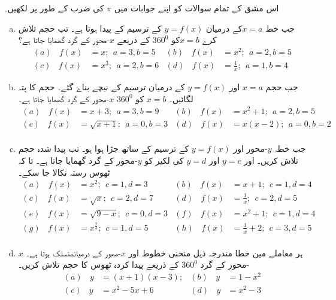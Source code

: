 اس مشق کے تمام سوالات کو اپنے جوابات میں \(\pi\) کی ضرب کے طور پر لکھیں۔
\begin{enumerate}[a.]
\item
جب خط  \(x=a\)کے درمیان \(y=f(x)\) کے ترسیم کے پیدا ہوتا ہے۔ تب حجم تلاش کرے \(x=b\)کو \(360^0\) کے ذریعے  \(x\)-محور کے گرد گھمایا جاتا ہے؟
\begin{align*}
(a) \> \> \> \> f(x)&=x; \> \> a=3, b=5  & (b)  \> \> \> \> f(x)&=x^{2};  \> \>a=2, b=5 \\
(c) \> \> \> \> f(x)&=x^{3};  \> \> a=2, b=6 & (d)  \> \> \> \> f(x)&= \frac {1}{x} ; \> \> a=1, b=4
\end{align*}
\item
جب حجم  \(x=a\) اور \(y=f(x)\) کے درمیان ترسیم کے نیچے بناۓ گئے۔ حجم کا پتہ لگائیں۔ \(x=b\) کو \(360^0\) \(x\)-محور کے گرد گھمایا جاتا ہے۔
\begin{align*}
(a) \> \> \> \>f(x)&=x+3;  \> \> a=3, b=9 &  (b) \> \> \> \> f(x)&=x^{2}+1;  \> \>a=2, b=5 \\
(c) \> \> \> \> f(x)&=\sqrt {x+1} ;  \> \> a=0, b=3 & (d) \> \> \> \> f(x)&= x(x-2) ; \> \> a=0, b=2\\
\end{align*}
\item
جب خطہ \(y\)-محور اور \(y=f(x)\)  کے ترسیم کے ساتھ جڑا ہوا ہو۔  تب پیدا شدہ حجم تلاش کریں۔ اور \(y=c\)  اور \(y=d\)  کی لکیر کو \(y\)-محور کے گرد گھمایا جاتا ہے۔ تا کہ ٹھوس رستہ نکالا جا سکے۔ 
\begin{align*}
(a) \> \> \> \> f(x)&=x^{2};  \> \> c=1, d=3  & (b)  \> \> \> \> f(x)&=x+1;  \> \>c=1, d=4 \\ 
(c)  \> \> \> \> f(x)&=\sqrt {x} ;  \> \> c=2, d=7  & (d)  \> \> \> \> f(x)&= \frac {1}{x} ; \> \> c=2, d=5\\ 
(e) \> \> \> \> f(x)&= \sqrt {9-x};  \> \> c=0, d=3  & (f)  \> \> \> \> f(x)&=x^{2}+1;  \> \>c=1, d=4 \\
(g)  \> \> \> \> f(x)&=x^{\frac {2}{3}} ;  \> \> c=1, d=5  & (h)  \> \> \> \> f(x)&= \frac {1}{x} +2 ; \> \> c=3, d=5\\
\end{align*}
\item
ہر معاملے مین خطا مندرجہ ذیل منحنی خطوط  اور \(x\)-مھور کے درمیانمنسلک ہوتا ہے۔ \(x\)-محور کے گرد \(360^0\) کے ذریعے پیدا کردہ ٹھوس کا حجم تلاش کریں۔
\begin{align*}
(a) \> \> \> \>y&=(x+1)(x-3); & (b) \> \> \> \> y&=1-x^{2} \\
(c) \> \> \> \>y&=x^{2}-5x+6 & (d) \> \> \> \> y&= x^{2}-3 \\

\end{align*}
\end{enumerate}
